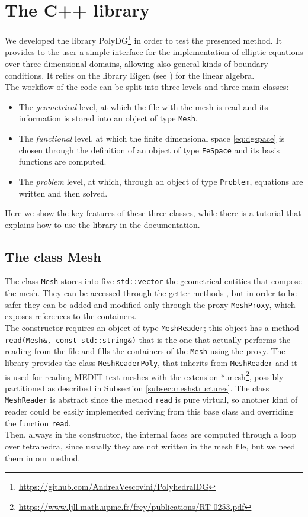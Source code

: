 \documentclass[12pt, a4paper]{article}
\theoremstyle{definition}
\theoremstyle{plain}
\theoremstyle{plain}
\theoremstyle{definition}
\begin{document}
\section{The C++ library}\label{sec:lib}
We developed the library PolyDG\footnote{\url{https://github.com/AndreaVescovini/PolyhedralDG}} in order to test the presented method. It provides to the user a simple interface for the implementation of elliptic equations over
three-dimensional domains, allowing also general kinds of boundary conditions. It relies on the library Eigen (see \cite{eigen}) for the linear algebra.\\
The workflow of the code can be split into three levels and three main classes:
\begin{itemize}
	\item The \emph{geometrical} level, at which the file with the mesh is read and its information is stored into an object of type \lstinline|Mesh|.
	\item The \emph{functional} level, at which the finite dimensional space \eqref{eq:dgspace} is chosen through the definition of an object of type \lstinline|FeSpace| and its basis functions are computed.
	\item The \emph{problem} level, at which, through an object of type \lstinline|Problem|, equations are written and then solved.
\end{itemize}
Here we show the key features of these three classes, while there is a tutorial that explains how to use the library in the documentation.
\subsection{The class Mesh}

The class \lstinline|Mesh| stores into five \lstinline|std::vector| the geometrical entities that compose the mesh. They can be accessed through the getter methods , but in order to be safer they can be added and modified only through the proxy \lstinline|MeshProxy|, which exposes references to the containers.\\
The constructor requires an object of type \lstinline|MeshReader|; this object has a method \lstinline|read(Mesh&, const std::string&)| that is the one that actually performs the reading from the file and fills the containers of the \lstinline|Mesh| using the proxy. The library provides the class \lstinline|MeshReaderPoly|, that inherits from \lstinline|MeshReader| and it is used for reading MEDIT text meshes with the extension *.mesh\footnote{\url{https://www.ljll.math.upmc.fr/frey/publications/RT-0253.pdf}}, possibly partitioned as described in Subsection \ref{subsec:meshstructures}. The class \lstinline|MeshReader| is abstract since the method \lstinline|read| is pure virtual, so another kind of reader could be easily implemented deriving from this base class and overriding the function \lstinline|read|.\\
Then, always in the constructor, the internal faces are computed through a loop over tetrahedra, since usually they are not written in the mesh file, but we need them in our method.\\
\end{document}
